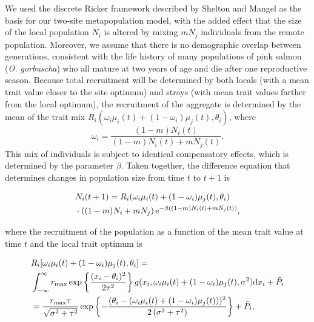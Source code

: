 \documentclass{revtex4}
\begin{document}
We used the discrete Ricker framework described by Shelton and Mangel \citep{Shelton:2011eq} as the basis for our two-site metapopulation model, with the added effect that the size of the local population $N_i$ is altered by mixing $mN_j$ individuals from the remote population.
Moreover, we assume that there is no demographic overlap between generations, consistent with the life history of many populations of pink salmon (\emph{O. gorbuscha}) who all mature at two years of age and die after one reproductive season.
Because total recruitment will be determined by both locals (with a mean trait value closer to the site optimum) and strays (with mean trait values farther from the local optimum), the recruitment of the aggregate is determined by the mean of the trait mix $R_i(\omega_i\mu_i(t) + (1-\omega_i)\mu_j(t),\theta_i)$, where
\begin{equation}
\omega_i=\frac{(1-m)N_i(t)}{(1-m) N_i(t) + m N_j(t)}.
\end{equation}
This mix of individuals is subject to identical compensatory effects, which is determined by the parameter $\beta$.
Taken together, the difference equation that determines changes in population size from time $t$ to $t+1$ is

\begin{align}
  \label{eq:N}
  &N_i(t+1) = R_i(\omega_i\mu_i(t) + (1-\omega_i)\mu_j(t),\theta_i) \\ \nonumber
  &\cdot \left((1-m)N_i + mN_j\right){\rm e}^{-\beta ((1-m)N_i(t) + m N_j(t))},
\end{align}

\noindent where the recruitment of the population as a function of the mean trait value at time $t$ and the local trait optimum is

\begin{align}
  \label{eq:R}
  &R_i[\omega_i\mu_i(t) + (1-\omega_i)\mu_j(t),\theta_i] = \\ \nonumber
  &\int_{-\infty}^\infty r_{\rm max}\exp\left\{\frac{(x_i-\theta_i)^2}{2\tau^2}\right\} g(x_i,\omega_i\mu_i(t) + (1-\omega_i)\mu_j(t),\sigma^2) {\rm d}x_i +\tilde{P}_i\\ \nonumber
  &= \frac{r_{\rm max} \tau  }{\sqrt{\sigma ^2+\tau ^2}}\exp\left\{-\frac{(\theta_i-(\omega_i\mu_i(t) + (1-\omega_i)\mu_j(t)))^2}{2 \left(\sigma ^2+\tau ^2\right)}\right\} +\tilde{P}_i,
\end{align}
\end{document}
